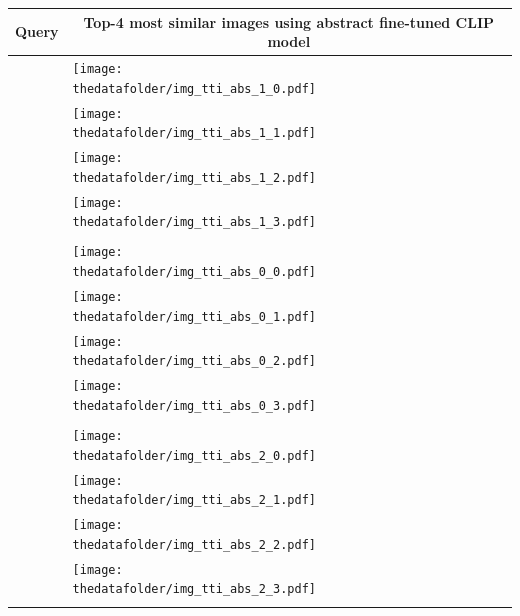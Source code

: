 \documentclass[10pt]{article} %
\begin{document}
\begin{table}[h!]
  \centering
  \begin{tabular}{m{2.7cm} p{2.9cm} p{2.9cm} p{2.9cm} p{2.9cm}}
    \toprule
      \centering \bfseries Query & \multicolumn{4}{c}{\bfseries{Top-4 most similar images using \textcolor{deepblue}{abstract fine-tuned CLIP model}}} \tabularnewline
      \midrule
      \texttt{} \vspace{20mm} & \centering \texttt{[image: \\thedatafolder/img\_tti\_abs\_1\_0.pdf]} \\  & \centering \texttt{[image: \\thedatafolder/img\_tti\_abs\_1\_1.pdf]} \\  & \centering \texttt{[image: \\thedatafolder/img\_tti\_abs\_1\_2.pdf]} \\  & \centering \texttt{[image: \\thedatafolder/img\_tti\_abs\_1\_3.pdf]} \\   \tabularnewline
      \midrule
      \texttt{} \vspace{20mm} & \centering \texttt{[image: \\thedatafolder/img\_tti\_abs\_0\_0.pdf]} \\  & \centering \texttt{[image: \\thedatafolder/img\_tti\_abs\_0\_1.pdf]} \\  & \centering \texttt{[image: \\thedatafolder/img\_tti\_abs\_0\_2.pdf]} \\  & \centering \texttt{[image: \\thedatafolder/img\_tti\_abs\_0\_3.pdf]} \\   \tabularnewline
      \midrule
      \texttt{} \vspace{20mm} & \centering \texttt{[image: \\thedatafolder/img\_tti\_abs\_2\_0.pdf]} \\  & \centering \texttt{[image: \\thedatafolder/img\_tti\_abs\_2\_1.pdf]} \\  & \centering \texttt{[image: \\thedatafolder/img\_tti\_abs\_2\_2.pdf]} \\  & \centering \texttt{[image: \\thedatafolder/img\_tti\_abs\_2\_3.pdf]} \\   \tabularnewline

\end{tabular}
\end{table}
\end{document}
